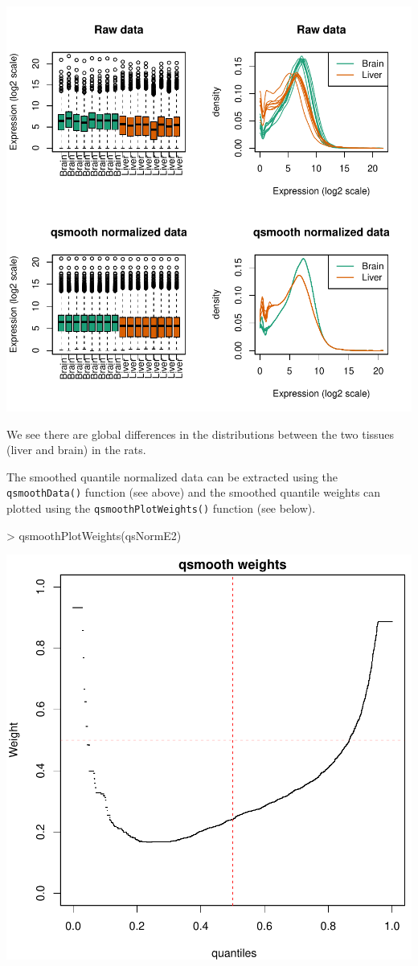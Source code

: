 \documentclass{article}
\begin{document}
\includegraphics{qsmooth-vignette-calculate-qsmooth2}

We see there are global differences in the distributions between the
two tissues (liver and brain) in the rats.

The smoothed quantile normalized data can be extracted using the
\texttt{qsmoothData()} function (see above) and the smoothed quantile weights
can plotted using the \texttt{qsmoothPlotWeights()} function (see below).

\begin{Schunk}
\begin{Sinput}
> qsmoothPlotWeights(qsNormE2)
\end{Sinput}
\end{Schunk}
\includegraphics{qsmooth-vignette-plot-qsmooth2-weights}
\end{document}
